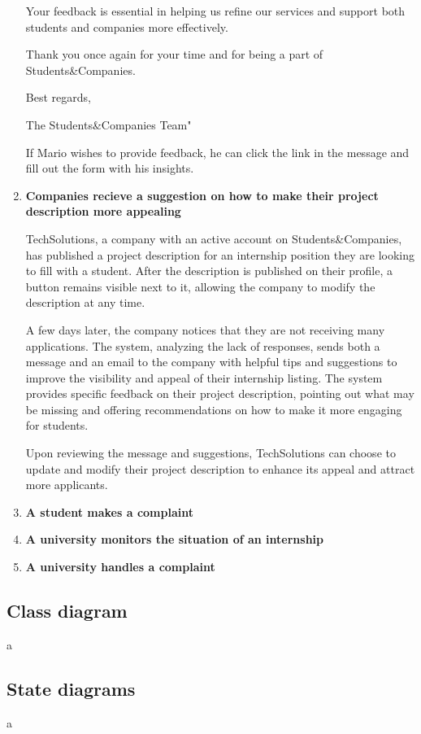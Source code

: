 \begin{enumerate}
    Your feedback is essential in helping us refine our services and support both students and companies more effectively.

    Thank you once again for your time and for being a part of Students\&Companies.

    Best regards,
    
    The Students\&Companies Team"

    If Mario wishes to provide feedback, he can click the link in the message and fill out the form with his insights.

    \item \textbf{Companies recieve a suggestion on how to make their project description more appealing}

    TechSolutions, a company with an active account on Students\&Companies, has published a project description for an internship position they are looking to fill with a student. After the description is published on their profile, a button remains visible next to it, allowing the company to modify the description at any time.

    A few days later, the company notices that they are not receiving many applications. The system, analyzing the lack of responses, sends both a message and an email to the company with helpful tips and suggestions to improve the visibility and appeal of their internship listing. The system provides specific feedback on their project description, pointing out what may be missing and offering recommendations on how to make it more engaging for students.

    Upon reviewing the message and suggestions, TechSolutions can choose to update and modify their project description to enhance its appeal and attract more applicants.
    \item \textbf{A student makes a complaint}

    

    \item \textbf{A university monitors the situation of an internship}

    \item \textbf{A university handles a complaint}
\end{enumerate}


\subsection{Class diagram}
a

\subsection{State diagrams}
a

